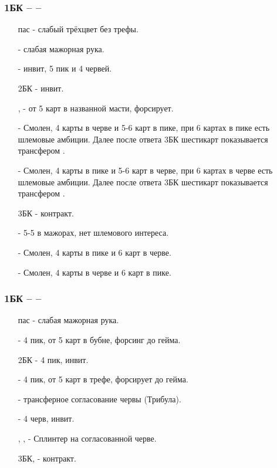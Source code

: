 \documentclass{article}
\begin{document}
\subsubsection{1БК --  -- }
\begin{enumerate}
    \item[пас] - слабый трёхцвет без трефы.
    \item[\he{2}] - слабая мажорная рука.
    \item[\sp{2}] - инвит, 5 пик и 4 червей.
    \item[2БК] - инвит.
    \item[\cl{3}, \di{3}] - от 5 карт в названной масти, форсирует.
    \item[\he{3}] - Смолен, 4 карты в черве и 5-6 карт в пике, при 6 картах в пике есть шлемовые амбиции. Далее после ответа 3БК шестикарт показывается трансфером .
    \item[\sp{3}] - Смолен, 4 карты в пике и 5-6 карт в черве, при 6 картах в черве есть шлемовые амбиции. Далее после ответа 3БК шестикарт показывается трансфером .
    \item[3БК] - контракт.
    \item[\cl{4}] - 5-5 в мажорах, нет шлемового интереса.
    \item[\di{4}] - Смолен, 4 карты в пике и 6 карт в черве.
    \item[\he{4}] - Смолен, 4 карты в черве и 6 карт в пике.
\end{enumerate}
\subsubsection{1БК --  -- }
\begin{enumerate}
    \item[пас] - слабая мажорная рука.
    \item[\sp{2}] - 4 пик, от 5 карт в бубне, форсинг до гейма.
    \item[2БК] - 4 пик, инвит.
    \item[\cl{3}] - 4 пик, от 5 карт в трефе, форсирует до гейма.
    \item[\di{3}] - трансферное согласование червы (Трибула).
    \item[\he{3}] - 4 черв, инвит.
    \item[\sp{3}, \cl{4}, \di{4}] - Сплинтер на согласованной черве.
    \item[3БК, \he{4}] - контракт.
\end{enumerate}
\end{document}
